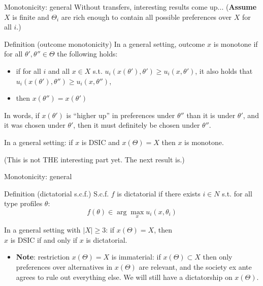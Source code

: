 \documentclass[english,10pt
,aspectratio=169
]{beamer}
\begin{document}
\begin{frame}{Monotonicity: general}
	Without transfers, interesting results come up... (\textbf{Assume} $X$ is finite and $\Theta_i$ are rich enough to contain all possible preferences over $X$ for all $i$.)
	\begin{exampleblock}{Definition (outcome monotonicity)}
		In a general setting, outcome $x$ is \alert{monotone} if for all $\theta',\theta'' \in \Theta$ the following holds:
		\begin{itemize}
			\item if for all $i$ and all $x \in X$ s.t. $u_i(x(\theta'),\theta') \geq u_i(x,\theta')$, it also holds that $u_i(x(\theta'),\theta'') \geq u_i(x,\theta'')$,
			\item then $x(\theta'')=x(\theta')$
		\end{itemize}
	\end{exampleblock}
	In words, if $x(\theta')$ is ``higher up'' in preferences under $\theta''$ than it is under $\theta'$, and it was chosen under $\theta'$, then it must definitely be chosen under $\theta''$.
	\begin{theorem}
		In a general setting: if $x$ is DSIC and $x(\Theta)=X$ then $x$ is monotone.
	\end{theorem}
	(This is not THE interesting part yet. The next result is.)
\end{frame}


\begin{frame}{Monotonicity: general}
	\begin{exampleblock}{Definition (dictatorial s.c.f.)}
		S.c.f. $f$ is \alert{dictatorial} if there exists $i \in N$ s.t. for all type profiles $\theta$:
		$$ f(\theta) \in \arg \max_x u_i(x,\theta_i)$$
	\end{exampleblock}
	\begin{theorem}
		In a general setting with $|X|\geq 3$: if $x(\Theta)=X$, then\\
		\centering
		$x$ is \alert{DSIC} if and only if $x$ is \alert{dictatorial}.
	\end{theorem}
	\begin{itemize}
		\item \textbf{Note}: restriction $x(\Theta)=X$ is immaterial: if $x(\Theta) \subset X$ then only preferences over alternatives in $x(\Theta)$ are relevant, and the society ex ante agrees to rule out everything else. We will still have a dictatorship on $x(\Theta)$.
	\end{itemize}
\end{frame}
\end{document}
